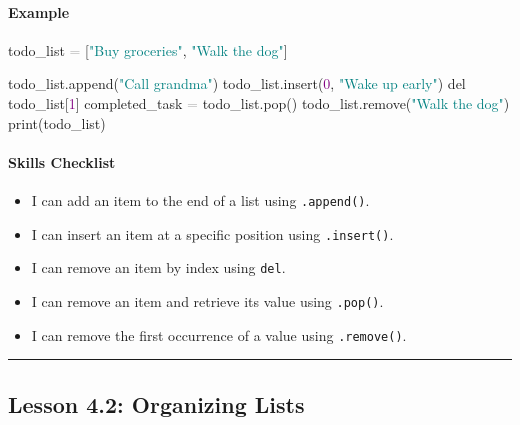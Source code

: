 \documentclass[
  justified,
  openright,
]{tufte-book}
\let\subsubsection\paragraph
\let\paragraph\paragraph
\newcommand{\BuiltInTok}[1]{#1}
\newcommand{\DecValTok}[1]{\textcolor{Purple}{#1}}
\newcommand{\KeywordTok}[1]{\textcolor{BrandBlue}{#1}}
\newcommand{\NormalTok}[1]{#1}
\newcommand{\OperatorTok}[1]{\textcolor{DarkGray}{#1}}
\newcommand{\StringTok}[1]{\textcolor{Teal}{#1}}
\newenvironment{Shaded}{%
  \begin{snugshade}
}{%
  \end{snugshade}
}
\let\subsubsection\paragraph
\let\paragraph\paragraph
\providecommand{\tightlist}{%
  \setlength{\itemsep}{0pt}\setlength{\parskip}{0pt}}
\begin{document}
\subsubsection{Example}\label{example}

\begin{Shaded}
\begin{Highlighting}[]
\NormalTok{todo\_list }\OperatorTok{=}\NormalTok{ [}\StringTok{"Buy groceries"}\NormalTok{, }\StringTok{"Walk the dog"}\NormalTok{]}

\NormalTok{todo\_list.append(}\StringTok{"Call grandma"}\NormalTok{)}
\NormalTok{todo\_list.insert(}\DecValTok{0}\NormalTok{, }\StringTok{"Wake up early"}\NormalTok{)}
\KeywordTok{del}\NormalTok{ todo\_list[}\DecValTok{1}\NormalTok{]}
\NormalTok{completed\_task }\OperatorTok{=}\NormalTok{ todo\_list.pop()}
\NormalTok{todo\_list.remove(}\StringTok{"Walk the dog"}\NormalTok{)}
\BuiltInTok{print}\NormalTok{(todo\_list)}
\end{Highlighting}
\end{Shaded}

\subsubsection{Skills Checklist}\label{skills-checklist-17}

\begin{itemize}
\tightlist
\item[$\square$]
  I can add an item to the end of a list using \texttt{.append()}.
\item[$\square$]
  I can insert an item at a specific position using \texttt{.insert()}.
\item[$\square$]
  I can remove an item by index using \texttt{del}.
\item[$\square$]
  I can remove an item and retrieve its value using \texttt{.pop()}.
\item[$\square$]
  I can remove the first occurrence of a value using \texttt{.remove()}.
\end{itemize}

\begin{center}\rule{0.5\linewidth}{0.5pt}\end{center}

\subsection{Lesson 4.2: Organizing
Lists}\label{lesson-4.2-organizing-lists}
\end{document}
